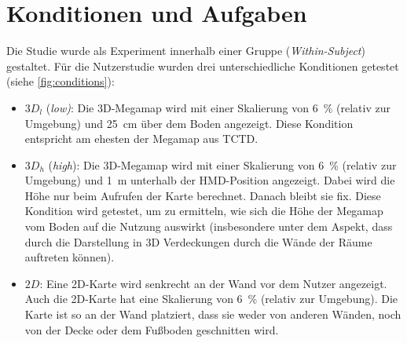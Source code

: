 \section{Konditionen und Aufgaben}
\label{sec:conditions_and_tasks}
Die Studie wurde als Experiment innerhalb einer Gruppe (\emph{Within-Subject}) gestaltet.
Für die Nutzerstudie wurden drei unterschiedliche Konditionen getestet (siehe \autoref{fig:conditions}):
\begin{itemize}
    \item $3D_l$ (\emph{low)}: Die 3D-Megamap wird mit einer Skalierung von \SI{6}{\percent} (relativ zur Umgebung) und \SI{25}{\cm} über dem Boden angezeigt.
    Diese Kondition entspricht am ehesten der Megamap aus TCTD. 
    \item $3D_h$ (\emph{high}): Die 3D-Megamap wird mit einer Skalierung von \SI{6}{\percent} (relativ zur Umgebung) und \SI{1}{\metre} unterhalb der HMD-Position angezeigt.
    Dabei wird die Höhe nur beim Aufrufen der Karte berechnet.
    Danach bleibt sie fix.
    Diese Kondition wird getestet, um zu ermitteln, wie sich die Höhe der Megamap vom Boden auf die Nutzung auswirkt (insbesondere unter dem Aspekt, dass durch die Darstellung in 3D Verdeckungen durch die Wände der Räume auftreten können).
    \item $2D$: Eine 2D-Karte wird senkrecht an der Wand vor dem Nutzer angezeigt.
    Auch die 2D-Karte hat eine Skalierung von \SI{6}{\percent} (relativ zur Umgebung).
    Die Karte ist so an der Wand platziert, dass sie weder von anderen Wänden, noch von der Decke oder dem Fußboden geschnitten wird.
\end{itemize}
